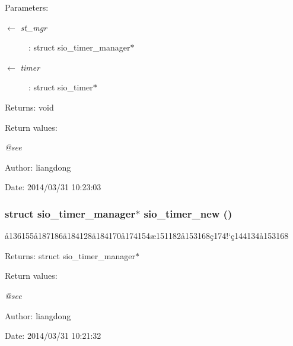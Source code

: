 \begin{Desc}
\item[Parameters:]
\begin{description}
\item[\mbox{$\leftarrow$} {\em st\_\-mgr}]: struct sio\_\-timer\_\-manager$\ast$ \item[\mbox{$\leftarrow$} {\em timer}]: struct sio\_\-timer$\ast$ \end{description}
\end{Desc}
\begin{Desc}
\item[Returns:]void \end{Desc}
\begin{Desc}
\item[Return values:]
\begin{description}
\item[{\em @see}]\end{description}
\end{Desc}
\begin{Desc}
\item[Author:]liangdong \end{Desc}
\begin{Desc}
\item[Date:]2014/03/31 10:23:03 \end{Desc}
\subsubsection{\setlength{\rightskip}{0pt plus 5cm}struct sio\_\-timer\_\-manager$\ast$ sio\_\-timer\_\-new ()}\label{sio__timer_8c_a3}


\aa{}136155\aa{}187186\"{a}184128\"{a}184170\aa{}174154\ae{}151182\aa{}153168\c{c}174!`\c{c}144134\aa{}153168 

\begin{Desc}
\item[Returns:]struct sio\_\-timer\_\-manager$\ast$ \end{Desc}
\begin{Desc}
\item[Return values:]
\begin{description}
\item[{\em @see}]\end{description}
\end{Desc}
\begin{Desc}
\item[Author:]liangdong \end{Desc}
\begin{Desc}
\item[Date:]2014/03/31 10:21:32 \end{Desc}
